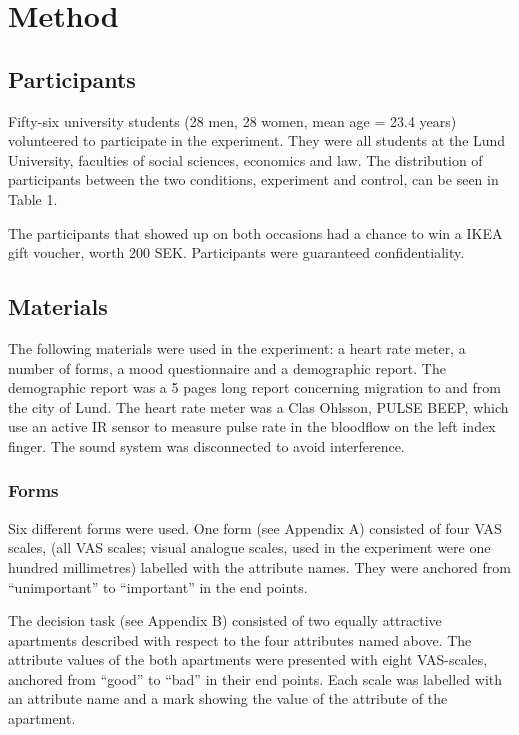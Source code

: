 \documentclass[jou,draftfirst,11pt]{apa6}
\begin{document}
\section{Method}

\subsection{Participants}

Fifty-six university students (28 men, 28 women, mean age = 23.4
years) volunteered to participate in the experiment.  They were all
students at the Lund University, faculties of social sciences,
economics and law.  The distribution of participants between the two
conditions, experiment and control, can be seen in Table 1.



The participants that showed up on both occasions had a chance to win
a IKEA gift voucher, worth 200 SEK.  Participants were guaranteed
confidentiality.


\subsection{Materials}

The following materials were used in the experiment: a heart rate
meter, a number of forms, a mood questionnaire and a demographic
report.  The demographic report was a 5 pages long report concerning
migration to and from the city of Lund.  The heart rate meter was a
Clas Ohlsson, PULSE BEEP, which use an active IR sensor to measure
pulse rate in the bloodflow on the left index finger.  The sound
system was disconnected to avoid interference.

\subsubsection{Forms} Six different forms were used.  One form (see Appendix A)
consisted of four VAS scales, (all VAS scales; visual analogue scales,
used in the experiment were one hundred millimetres) labelled with the
attribute names.  They were anchored from ``unimportant'' to ``important''
in the end points.

The decision task (see Appendix B) consisted of two equally attractive
apartments described with respect to the four attributes named above.
The attribute values of the both apartments were presented with eight
VAS-scales, anchored from ``good'' to ``bad'' in their end points.  Each
scale was labelled with an attribute name and a mark showing the value
of the attribute of the apartment.
\end{document}
